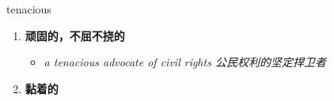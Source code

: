 
\begin{frame}
{\huge tenacious}
\begin{center}
\begin{enumerate}\Large
  \item \textbf{顽固的，不屈不挠的}
  \begin{itemize}
    \item \em{\Large{a tenacious advocate of civil rights 公民权利的坚定捍卫者}}
  \end{itemize}
  \item \textbf{黏着的}
\end{enumerate}
\end{center}
\end{frame}
